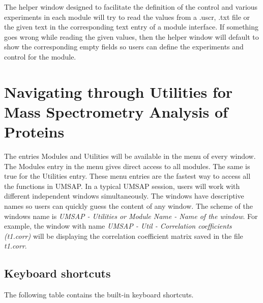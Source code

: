 The helper window designed to facilitate the definition of the control and various experiments in each module will try to read the values from a .uscr, .txt file or the given text in the corresponding text entry of a module interface. If something goes wrong while reading the given values, then the helper window will default to show the corresponding empty fields so users can define the experiments and control for the module.

\section{Navigating through Utilities for Mass Spectrometry Analysis of Proteins}

The entries Modules and Utilities will be available in the menu of every window. The Modules entry in the menu gives direct access to all modules. The same is true for the Utilities entry. These menu entries are the fastest way to access all the functions in UMSAP. In a typical UMSAP session, users will work with different independent windows simultaneously. The windows have descriptive names so users can quickly guess the content of any window. The scheme of the windows name is \textit{UMSAP - Utilities or Module Name - Name of the window}. For example, the window with name \textit{UMSAP - Util - Correlation coefficients (t\num[detect-all]{1}.corr)} will be displaying the correlation coefficient matrix saved in the file \textit{t\num{1}.corr}.

\subsection{Keyboard shortcuts}

The following table contains the built-in keyboard shortcuts.

